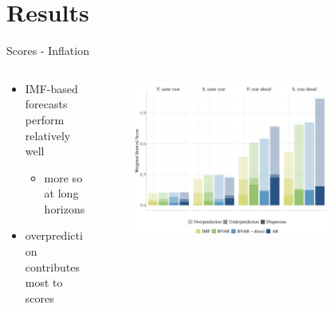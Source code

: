 \documentclass[en]{sdqbeamer}
\begin{document}
\section{Results}
\begin{frame}{Scores - Inflation}

\begin{columns}
\begin{column}{0.35\textwidth}
    \begin{itemize}
         \item IMF-based forecasts perform relatively well 
         \begin{itemize}
         \item more so at long horizons\medskip
         \end{itemize}
         \item overprediction contributes most to scores
    \end{itemize}
    \vspace{2cm}
\end{column}
\begin{column}{0.65\textwidth}
\vspace*{-.95cm}
    \begin{figure}
        \centering
        \includegraphics[width=0.8\textwidth]{figures_svr/svr_wis_pcpi_pch_absolute_rollingwindow.pdf} 
        \label{fig:enter-label}
    \end{figure} 
\end{column}
\end{columns}
\end{frame}
\end{document}
